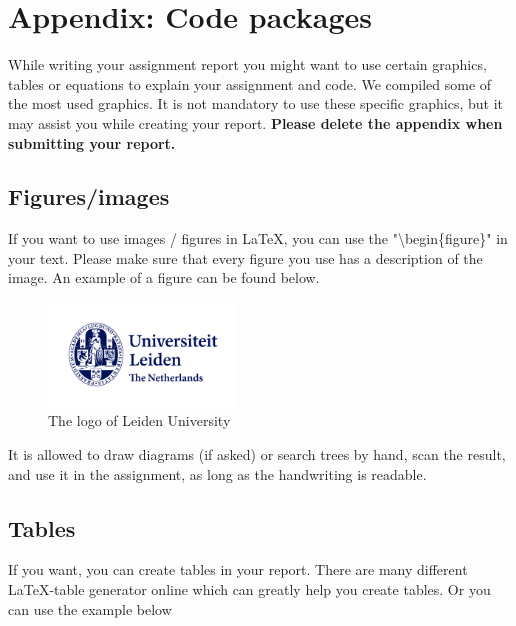 \documentclass{article}
\begin{document}
\printbibliography


\newpage

\section*{Appendix: Code packages}
While writing your assignment report you might want to use certain graphics, tables or equations to explain your assignment and code. We compiled some of the most used graphics. It is not mandatory to use these specific graphics, but it may assist you while creating your report. \textbf{Please delete the appendix when submitting your report.}


\subsection*{Figures/images}
If you want to use images / figures in LaTeX, you can use the "\textbackslash begin\{figure\}" in your text. Please make sure that every figure you use has a description of the image. An example of a figure can be found below.

\begin{figure}[ht!]
    \centering
        \includegraphics[width=5cm]{figures/ul-algemeen-internationaal-rgb-color.png}
        \caption{The logo of Leiden University}
    \label{fig:my_label}
\end{figure}

It is allowed to draw diagrams (if asked) or search trees by hand, scan the result, and use it in the assignment, as long as the handwriting is readable.  

\subsection*{Tables}
If you want, you can create tables in your report. There are many different \LaTeX -table generator online which can greatly help you create tables. Or you can use the example below
\end{document}
